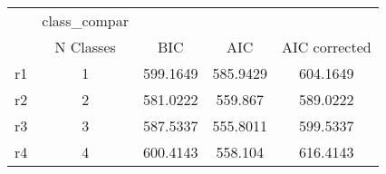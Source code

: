 \begin{tabular}{l*{4}{c}}
\hline\hline
            &class\_compar&            &            &            \\
            &   N Classes&         BIC&         AIC&AIC corrected\\
\hline
r1          &           1&    599.1649&    585.9429&    604.1649\\
r2          &           2&    581.0222&     559.867&    589.0222\\
r3          &           3&    587.5337&    555.8011&    599.5337\\
r4          &           4&    600.4143&     558.104&    616.4143\\
\hline\hline
\end{tabular}

